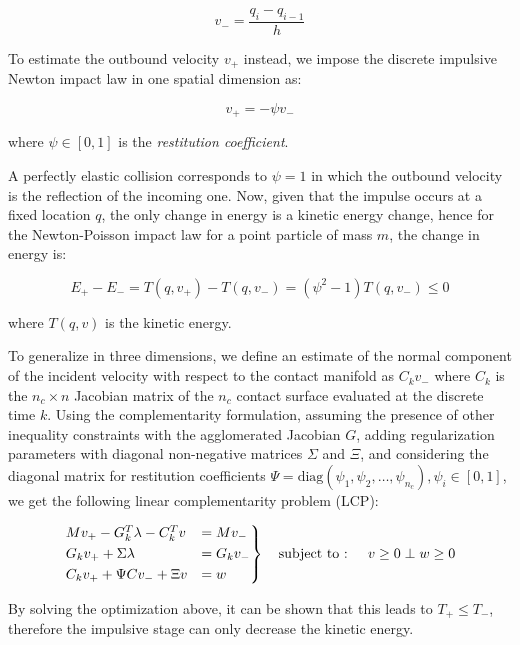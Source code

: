 \begin{equation}
    v _{-} = \frac{q _i - q _{i-1}}{h}
\end{equation}

To estimate the outbound velocity $v _{+}$ instead, we impose the discrete impulsive Newton impact law in one spatial dimension as:

\begin{equation}
    v _{+} = -\psi v _{-}
\end{equation}

where $\psi \in [0,1]$ is the \textit{restitution coefficient}.

A perfectly elastic collision corresponds to $\psi = 1$ in which the outbound velocity is the reflection of the incoming one. Now, given that the impulse occurs at a fixed location $q$, the only change in energy is a kinetic energy change, hence for the Newton-Poisson impact law for a point particle of mass $m$, the change in energy is:

\begin{equation}
    E _{+} - E _{-} = T(q, v _{+}) - T(q, v _{-}) = (\psi ^2 - 1) T(q, v _{-}) \leq 0
\end{equation}

where $T(q, v)$ is the kinetic energy.

To generalize in three dimensions, we define an estimate of the normal component of the incident velocity with respect to the contact manifold as $C _k v _{-}$ where $C _k$ is the $n _c \times n$ Jacobian matrix of the $n _c$ contact surface evaluated at the discrete time $k$. Using the complementarity formulation, assuming the presence of other inequality constraints with the agglomerated Jacobian $G$, adding regularization parameters with diagonal non-negative matrices $\Sigma$ and $\Xi$, and considering the diagonal matrix for restitution coefficients $\Psi = \text{diag}(\psi _1, \psi _2, \dots, \psi _{n _c}),  \psi _i \in [0, 1]$, we get the following linear complementarity problem (LCP):

\begin{equation}
    \begin{rcases}
        Mv _{+} - G ^T _k \lambda - C ^T _k v & = M v _{-}    \\
        G _k v _{+} + \Sigma \lambda          & = G _k v _{-} \\
        C _k v _{+} + \Psi C v _{-} + \Xi v   & = w           \\
    \end{rcases} \quad \text{subject to
        :  } \quad v \geq 0 \perp w \geq 0
\end{equation}

By solving the optimization above, it can be shown that this leads to $T _{+} \leq T _{-}$, therefore the impulsive stage can only decrease the kinetic energy.
